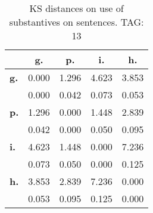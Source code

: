 \begin{table}[h!]
\begin{center}
\begin{tabular}{| l || c | c | c | c |}\hline
 & {\bf g.} & {\bf p.} & {\bf i.} & {\bf h.} \\\hline\hline
{\bf g.} & 0.000 & 1.296 & 4.623 & 3.853 \\
{\bf } & 0.000 & 0.042 & 0.073 & 0.053 \\\hline
{\bf p.} & 1.296 & 0.000 & 1.448 & 2.839 \\
{\bf } & 0.042 & 0.000 & 0.050 & 0.095 \\\hline
{\bf i.} & 4.623 & 1.448 & 0.000 & 7.236 \\
{\bf } & 0.073 & 0.050 & 0.000 & 0.125 \\\hline
{\bf h.} & 3.853 & 2.839 & 7.236 & 0.000 \\
{\bf } & 0.053 & 0.095 & 0.125 & 0.000 \\\hline
\end{tabular}
\caption{KS distances on use of substantives on sentences. TAG: 13}
\end{center}
\end{table}